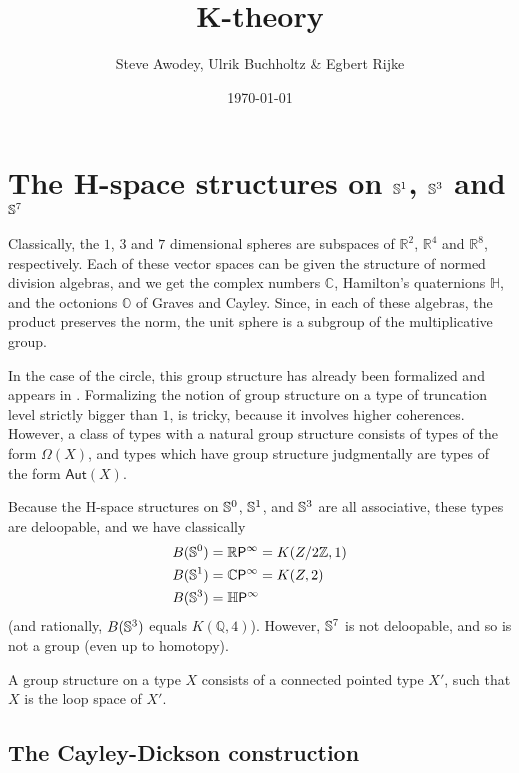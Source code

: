 \documentclass{article}
\title{K-theory}
\date{\today}
\author{Steve Awodey, Ulrik Buchholtz \& Egbert Rijke}
\begin{document}
\maketitle

\tableofcontents

\section{The H-space structures on $\mathbb{S}^1$, $\mathbb{S}^3$ and $\mathbb{S}^7$}
Classically, the $1$, $3$ and $7$ dimensional spheres are subspaces of $\mathbb{R}^2$,
$\mathbb{R}^4$ and $\mathbb{R}^8$, respectively. Each of these vector spaces can be
given the structure of normed division algebras, and we get the complex numbers
$\mathbb{C}$, Hamilton's quaternions $\mathbb{H}$, and the octonions $\mathbb{O}$
of Graves and Cayley. Since, in each of these algebras, the product preserves
the norm, the unit sphere is a subgroup of the multiplicative group.

In the case of the circle, this group structure has already been formalized and
appears in \cite{TheBook}. Formalizing the notion of group structure on a type
of truncation level strictly bigger than $1$, is tricky, because it involves
higher coherences. However, a class of types with a natural group structure
consists of types of the form $\Omega(X)$, and types which have group structure
judgmentally are types of the form $\mathsf{Aut}(X)$. 

Because the H-space structures on $\mathbb{S}^0$, $\mathbb{S}^1$, and $\mathbb{S}^3$ are
all associative, these types are deloopable, and we have classically
\begin{align*}
  B(\Sn^0) &= \mathbb{R}\mathsf{P}^\infty = K(\mathbb Z/2\mathbb Z,1) \\ 
  B(\Sn^1) &= \mathbb{C}\mathsf{P}^\infty = K(\mathbb Z,2) \\
  B(\Sn^3) &= \mathbb{H}\mathsf{P}^\infty
\end{align*}
(and rationally, $B(\mathbb{S}^3)$ equals $K(\mathbb{Q},4)$). However,
$\mathbb{S}^7$ is not deloopable, and so is not a group (even up to homotopy).

\begin{defn}
A group structure on a type $X$ consists of a connected pointed type $X'$, such
that $X$ is the loop space of $X'$.
\end{defn}

\subsection{The Cayley-Dickson construction}
\end{document}
